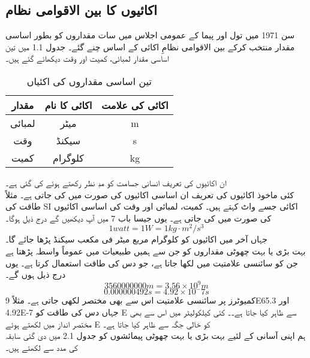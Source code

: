 \documentclass[leqno, b5paper]{khalid-urdu-book}
\begin{document}
	\subsection{اکائیوں کا بین الاقوامی نظام}
	سن 1971 میں تول اور پیما کے عمومی اجلاس میں سات مقداروں کو بطور اساسی مقدار منتخب کرکے بین الاقوامی نظامِ اکائی کے اساس چنے گئے۔ جدول 1.1 میں تین اساسی مقدار لمبائی، کمیت اور وقت دیکھائے گئے ہیں۔
	\begin{table}[h!]
		\centering
		\begin{tabular}{|c c c|} 
			\hline
			مقدار & اکائی کا نام & اکائی کی علامت\\ \hline\hline
			لمبائی & میٹر & m \\
			\hline
			وقت & سیکنڈ & s \\
			\hline
			کمیت & کلوگرام & kg \\
			\hline
		\end{tabular}
		\caption{تین اساسی مقداروں کی اکئیاں}
		\label{tab:my_label}
	\end{table}
	ان اکائیوں کی تعریف انسانی جسامت کو مدِ نظر رکھتے ہوئے کی گئی ہے۔\\کئی ماخوذ اکائیوں کی تعریف ان اساسی اکائیوں کی صورت میں کی جاتی ہے۔ مثلاً طاقت کی SI اکائی جسے واٹ کہتے ہیں۔ کمیت، لمبائی اور وقت کی اساسی اکائیوں کی صورت میں کی جاتی ہے۔ یوں جیسا باب 7 میں آپ دیکھیں گے درج ذیل ہوگا۔
	\begin{equation}
		1 watt = 1 W =1 kg\cdot m^2/s^3
	\end{equation}
	جہاں آخر میں اکائیوں کو کلوگرام مربع میٹر فی مکعب سیکنڈ پڑھا جائے گا۔\\بہت بڑی یا بہت چھوٹی مقداروں کو جن سے ہمیں طبیعیات میں عموماً واسطہ پڑھتا ہے جن کو سائنسی علامتیت میں لکھا جاتا ہے، جو دس کی طاقت استعمال کرتا ہے۔ یوں درج ذیل ہوں گے۔
	\begin{equation}
		3560000000 m = 3.56\times 10^9 m
	\end{equation}
	\begin{equation}
		0.000 000 492 s = 4.92\times 10^-7 s
	\end{equation}
	کمیوٹرز پر سائنسی علامتیت اس سے بھی مختصر لکھی جاتی ہے۔ مثلاً 9E65.3 اور 4.92E-7 جہاں دس کی طاقت کو E سے ظاہر کیا جاتا ہے۔۔ کئی کیلکولیٹر میں اس سے بھی مختصر انداز میں لکھتے ہوئے E کو خالی جگہ سے ظاہر کیا جاتا ہے۔\\ہم اپنی آسانی کے لئیے بہت بڑی یا بہت چھوٹی پیمائشوں کو جدول 2.1 میں دی گئی سابقہ کی مدد سے لکھتے ہیں۔
\end{document}
